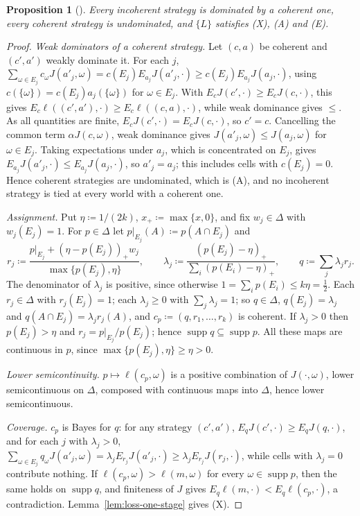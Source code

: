 \documentclass[11pt]{article}
\newtheorem{proposition}[theorem]{Proposition}
\theoremstyle{definition}
\theoremstyle{remark}
\newcommand{\supp}{\operatorname{supp}}
\begin{document}
\begin{proposition}[{\cite{Briggs2020,Nielsen2021}}]\label{prop:updating}
Every incoherent strategy is dominated by a coherent one, every coherent strategy is undominated, and $\{L\}$ satisfies (X), (A) and (E).
\end{proposition}
\begin{proof}
\emph{Weak dominators of a coherent strategy.} Let $(c,a)$ be coherent and $(c',a')$ weakly dominate it. For each $j$, $\sum_{\omega\in E_j}c_\omega J(a'_j,\omega)=c(E_j)E_{a_j}J(a'_j,\cdot)\ge c(E_j)E_{a_j}J(a_j,\cdot)$, using $c(\{\omega\})=c(E_j)a_j(\{\omega\})$ for $\omega\in E_j$. With $E_cJ(c',\cdot)\ge E_cJ(c,\cdot)$, this gives $E_c\ell((c',a'),\cdot)\ge E_c\ell((c,a),\cdot)$, while weak dominance gives $\le$. As all quantities are finite, $E_cJ(c',\cdot)=E_cJ(c,\cdot)$, so $c'=c$. Cancelling the common term $\alpha J(c,\omega)$, weak dominance gives $J(a'_j,\omega)\le J(a_j,\omega)$ for $\omega\in E_j$. Taking expectations under $a_j$, which is concentrated on $E_j$, gives $E_{a_j}J(a'_j,\cdot)\le E_{a_j}J(a_j,\cdot)$, so $a'_j=a_j$; this includes cells with $c(E_j)=0$. Hence coherent strategies are undominated, which is (A), and no incoherent strategy is tied at every world with a coherent one.

\emph{Assignment.} Put $\eta\coloneqq1/(2k)$, $x_+\coloneqq\max\{x,0\}$, and fix $w_j\in\Delta$ with $w_j(E_j)=1$. For $p\in\Delta$ let $p|_{E_j}(A)\coloneqq p(A\cap E_j)$ and
\[
r_j\coloneqq\frac{p|_{E_j}+(\eta-p(E_j))_+w_j}{\max\{p(E_j),\eta\}},\qquad \lambda_j\coloneqq\frac{(p(E_j)-\eta)_+}{\sum_i(p(E_i)-\eta)_+},\qquad q\coloneqq\sum_j\lambda_jr_j .
\]
The denominator of $\lambda_j$ is positive, since otherwise $1=\sum_ip(E_i)\le k\eta=\tfrac12$. Each $r_j\in\Delta$ with $r_j(E_j)=1$; each $\lambda_j\ge0$ with $\sum_j\lambda_j=1$; so $q\in\Delta$, $q(E_j)=\lambda_j$ and $q(A\cap E_j)=\lambda_jr_j(A)$, and $c_p\coloneqq(q,r_1,\dots,r_k)$ is coherent. If $\lambda_j>0$ then $p(E_j)>\eta$ and $r_j=p|_{E_j}/p(E_j)$; hence $\supp q\subseteq\supp p$. All these maps are continuous in $p$, since $\max\{p(E_j),\eta\}\ge\eta>0$.

\emph{Lower semicontinuity.} $p\mapsto\ell(c_p,\omega)$ is a positive combination of $J(\cdot,\omega)$, lower semicontinuous on $\Delta$, composed with continuous maps into $\Delta$, hence lower semicontinuous.

\emph{Coverage.} $c_p$ is Bayes for $q$: for any strategy $(c',a')$, $E_qJ(c',\cdot)\ge E_qJ(q,\cdot)$, and for each $j$ with $\lambda_j>0$, $\sum_{\omega\in E_j}q_\omega J(a'_j,\omega)=\lambda_jE_{r_j}J(a'_j,\cdot)\ge\lambda_jE_{r_j}J(r_j,\cdot)$, while cells with $\lambda_j=0$ contribute nothing. If $\ell(c_p,\omega)>\ell(m,\omega)$ for every $\omega\in\supp p$, then the same holds on $\supp q$, and finiteness of $J$ gives $E_q\ell(m,\cdot)<E_q\ell(c_p,\cdot)$, a contradiction. Lemma~\ref{lem:loss-one-stage} gives (X).
\end{proof}
\end{document}
